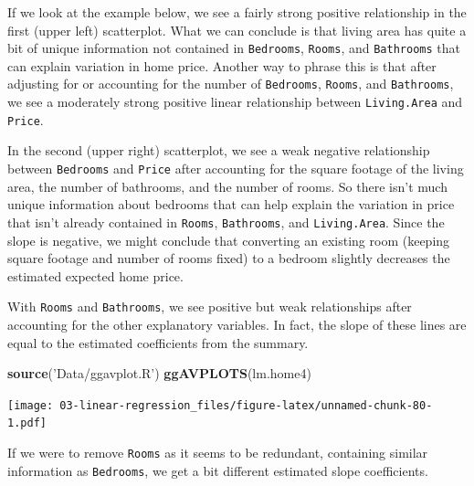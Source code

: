 \documentclass[
]{book}
\newenvironment{Shaded}{\begin{snugshade}}{\end{snugshade}}
\newcommand{\KeywordTok}[1]{\textcolor[rgb]{0.13,0.29,0.53}{\textbf{#1}}}
\newcommand{\NormalTok}[1]{#1}
\newcommand{\OperatorTok}[1]{\textcolor[rgb]{0.81,0.36,0.00}{\textbf{#1}}}
\newcommand{\StringTok}[1]{\textcolor[rgb]{0.31,0.60,0.02}{#1}}
\begin{document}
If we look at the example below, we see a fairly strong positive relationship in the first (upper left) scatterplot. What we can conclude is that living area has quite a bit of unique information not contained in \texttt{Bedrooms}, \texttt{Rooms}, and \texttt{Bathrooms} that can explain variation in home price. Another way to phrase this is that after adjusting for or accounting for the number of \texttt{Bedrooms}, \texttt{Rooms}, and \texttt{Bathrooms}, we see a moderately strong positive linear relationship between \texttt{Living.Area} and \texttt{Price}.

In the second (upper right) scatterplot, we see a weak negative relationship between \texttt{Bedrooms} and \texttt{Price} after accounting for the square footage of the living area, the number of bathrooms, and the number of rooms. So there isn't much unique information about bedrooms that can help explain the variation in price that isn't already contained in \texttt{Rooms}, \texttt{Bathrooms}, and \texttt{Living.Area}. Since the slope is negative, we might conclude that converting an existing room (keeping square footage and number of rooms fixed) to a bedroom slightly decreases the estimated expected home price.

With \texttt{Rooms} and \texttt{Bathrooms}, we see positive but weak relationships after accounting for the other explanatory variables. In fact, the slope of these lines are equal to the estimated coefficients from the summary.

\begin{Shaded}
\begin{Highlighting}[]
\KeywordTok{source}\NormalTok{(}\StringTok{'Data/ggavplot.R'}\NormalTok{)}
\KeywordTok{ggAVPLOTS}\NormalTok{(lm.home4)}
\end{Highlighting}
\end{Shaded}

\texttt{[image: 03-linear-regression\_files/figure-latex/unnamed-chunk-80-1.pdf]}

If we were to remove \texttt{Rooms} as it seems to be redundant, containing similar information as \texttt{Bedrooms}, we get a bit different estimated slope coefficients.

\begin{Shaded}
\end{Shaded}
\end{document}
